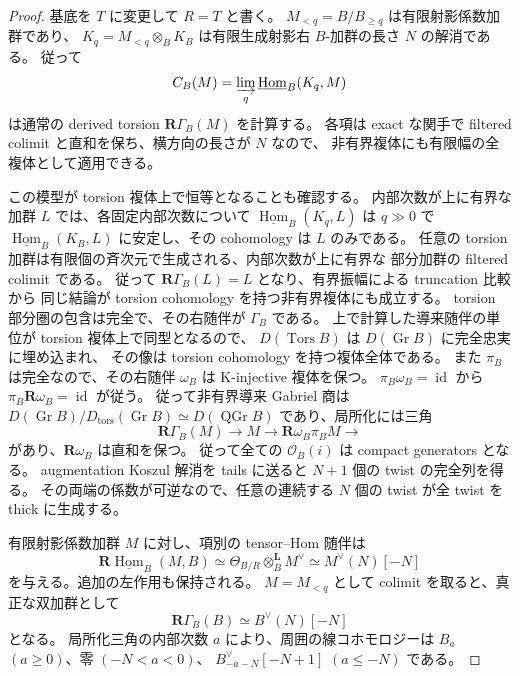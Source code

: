 \begin{proof}
基底を $T$ に変更して $R=T$ と書く。
$M_{<q}=B/B_{\geq q}$ は有限射影係数加群であり、
$K_q=M_{<q}\otimes_BK_B$ は有限生成射影右 $B$-加群の長さ $N$ の解消である。
従って
\[
 C_B(M)=\varinjlim_q\underline{\operatorname{Hom}}_B(K_q,M)
\]
は通常の derived torsion $\mathbf R\Gamma_B(M)$ を計算する。
各項は exact な関手で filtered colimit と直和を保ち、横方向の長さが $N$ なので、
非有界複体にも有限幅の全複体として適用できる。

この模型が torsion 複体上で恒等となることも確認する。
内部次数が上に有界な加群 $L$ では、各固定内部次数について
$\underline{\operatorname{Hom}}_B(K_q,L)$ は $q\gg0$ で
$\underline{\operatorname{Hom}}_B(K_B,L)$ に安定し、その cohomology は $L$ のみである。
任意の torsion 加群は有限個の斉次元で生成される、内部次数が上に有界な
部分加群の filtered colimit である。
従って $\mathbf R\Gamma_B(L)=L$ となり、有界振幅による truncation 比較から
同じ結論が torsion cohomology を持つ非有界複体にも成立する。
torsion 部分圏の包含は完全で、その右随伴が $\Gamma_B$ である。
上で計算した導来随伴の単位が torsion 複体上で同型となるので、
$D(\operatorname{Tors}B)$ は $D(\operatorname{Gr}B)$ に完全忠実に埋め込まれ、
その像は torsion cohomology を持つ複体全体である。
また $\pi_B$ は完全なので、その右随伴 $\omega_B$ は K-injective 複体を保つ。
$\pi_B\omega_B=\operatorname{id}$ から
$\pi_B\mathbf R\omega_B=\operatorname{id}$ が従う。
従って非有界導来 Gabriel 商は
$D(\operatorname{Gr}B)/D_{\mathrm{tors}}(\operatorname{Gr}B)
\simeq D(\operatorname{QGr}B)$ であり、局所化には三角
\[
 \mathbf R\Gamma_B(M)\longrightarrow M\longrightarrow
 \mathbf R\omega_B\pi_BM\longrightarrow
\]
があり、$\mathbf R\omega_B$ は直和を保つ。
従って全ての $\mathcal O_B(i)$ は compact generators となる。
augmentation Koszul 解消を tails に送ると $N+1$ 個の twist の完全列を得る。
その両端の係数が可逆なので、任意の連続する $N$ 個の twist が全 twist を thick に生成する。

有限射影係数加群 $M$ に対し、項別の tensor--Hom 随伴は
\[
 \mathbf R\underline{\operatorname{Hom}}_B(M,B)
 \simeq \Theta_{B/R}\otimes_B^{\mathbf L}M^\vee
 \simeq M^\vee(N)[-N]
\]
を与える。追加の左作用も保持される。
$M=M_{<q}$ として colimit を取ると、真正な双加群として
\[
 \mathbf R\Gamma_B(B)\simeq B^\vee(N)[-N]
\]
となる。
局所化三角の内部次数 $a$ により、周囲の線コホモロジーは
$B_a$ $(a\geq0)$、零 $(-N<a<0)$、
$B_{-a-N}^{\vee}[-N+1]$ $(a\leq-N)$ である。


\end{proof}
